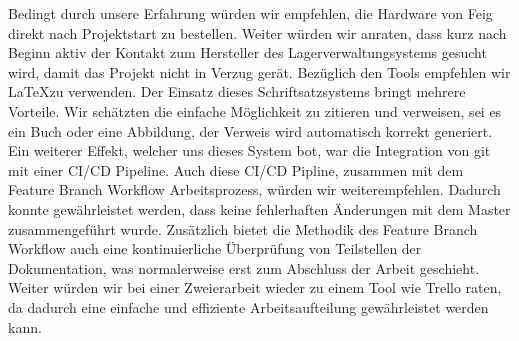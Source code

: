Bedingt durch unsere Erfahrung würden wir empfehlen, die Hardware von Feig direkt nach Projektstart zu bestellen. Weiter würden wir anraten, dass kurz nach Beginn aktiv der Kontakt zum Hersteller des Lagerverwaltungsystems gesucht wird, damit das Projekt nicht in Verzug gerät. Bezüglich den Tools empfehlen wir \LaTeX zu verwenden. Der Einsatz dieses Schriftsatzsystems bringt mehrere Vorteile. Wir schätzten die einfache Möglichkeit zu zitieren und verweisen, sei es ein Buch oder eine Abbildung, der Verweis wird automatisch korrekt generiert. Ein weiterer Effekt, welcher uns dieses System bot, war die Integration von git mit einer CI/CD Pipeline. Auch diese CI/CD Pipline, zusammen mit dem Feature Branch Workflow Arbeitsprozess, würden wir weiterempfehlen. Dadurch konnte gewährleistet werden, dass keine fehlerhaften Änderungen mit dem Master zusammengeführt wurde. Zusätzlich bietet die Methodik des Feature Branch Workflow auch eine kontinuierliche Überprüfung von Teilstellen der Dokumentation, was normalerweise erst zum Abschluss der Arbeit geschieht. Weiter würden wir bei einer Zweierarbeit wieder zu einem Tool wie Trello raten, da dadurch eine einfache und effiziente Arbeitsaufteilung gewährleistet werden kann.